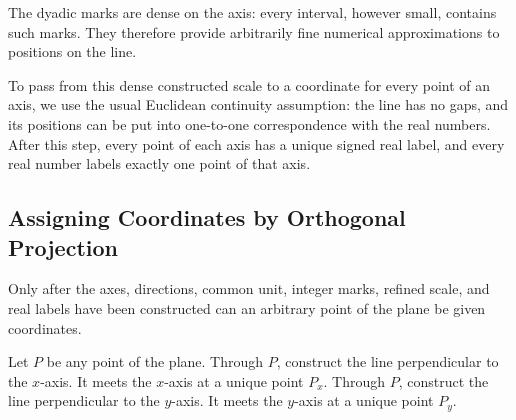 \begin{center}
\end{center}

The dyadic marks are dense on the axis: every interval, however small, contains
such marks. They therefore provide arbitrarily fine numerical approximations to
positions on the line.

To pass from this dense constructed scale to a coordinate for every point of an
axis, we use the usual Euclidean continuity assumption: the line has no gaps,
and its positions can be put into one-to-one correspondence with the real
numbers. After this step, every point of each axis has a unique signed real
label, and every real number labels exactly one point of that axis.

\subsection{Assigning Coordinates by Orthogonal Projection}

Only after the axes, directions, common unit, integer marks, refined scale, and
real labels have been constructed can an arbitrary point of the plane be given
coordinates.

Let $P$ be any point of the plane. Through $P$, construct the line perpendicular
to the $x$-axis. It meets the $x$-axis at a unique point $P_x$. Through $P$,
construct the line perpendicular to the $y$-axis. It meets the $y$-axis at a
unique point $P_y$.

\begin{center}
\end{center}

